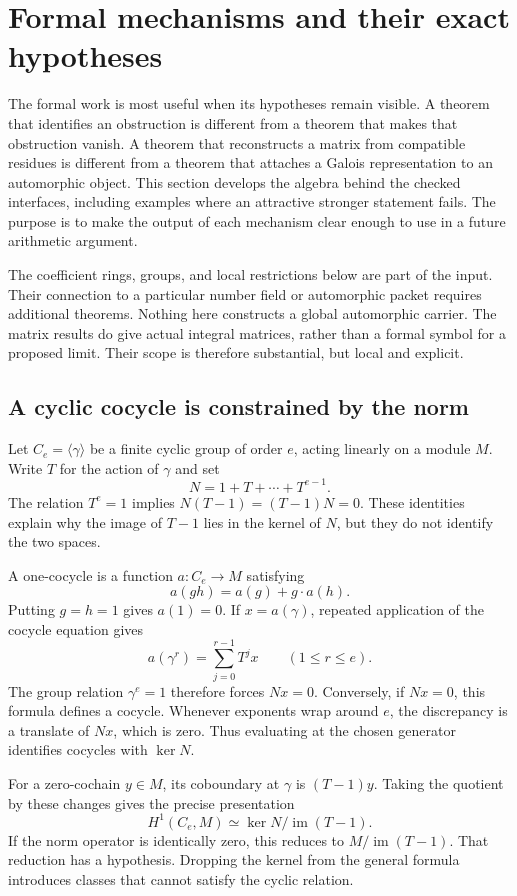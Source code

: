 \section{Formal mechanisms and their exact hypotheses}
\label{sec:formal-mechanisms}

The formal work is most useful when its hypotheses remain visible. A theorem
that identifies an obstruction is different from a theorem that makes that
obstruction vanish. A theorem that reconstructs a matrix from compatible
residues is different from a theorem that attaches a Galois representation to
an automorphic object. This section develops the algebra behind the checked
interfaces, including examples where an attractive stronger statement fails.
The purpose is to make the output of each mechanism clear enough to use in a
future arithmetic argument.

The coefficient rings, groups, and local restrictions below are part of the
input. Their connection to a particular number field or automorphic packet
requires additional theorems. Nothing here constructs a global automorphic
carrier. The matrix results do give actual integral matrices, rather than a
formal symbol for a proposed limit. Their scope is therefore substantial, but
local and explicit.

\subsection{A cyclic cocycle is constrained by the norm}

Let $C_e=\langle\gamma\rangle$ be a finite cyclic group of order $e$, acting
linearly on a module $M$. Write $T$ for the action of $\gamma$ and set
\[
 N=1+T+\cdots+T^{e-1}.
\]
The relation $T^e=1$ implies $N(T-1)=(T-1)N=0$. These identities explain why
the image of $T-1$ lies in the kernel of $N$, but they do not identify the two
spaces.

A one-cocycle is a function $a:C_e\to M$ satisfying
\[
 a(gh)=a(g)+g\cdot a(h).
\]
Putting $g=h=1$ gives $a(1)=0$. If $x=a(\gamma)$, repeated application of the
cocycle equation gives
\[
 a(\gamma^r)=\sum_{j=0}^{r-1}T^j x\qquad(1\le r\le e).
\]
The group relation $\gamma^e=1$ therefore forces $Nx=0$. Conversely, if
$Nx=0$, this formula defines a cocycle. Whenever exponents wrap around $e$,
the discrepancy is a translate of $Nx$, which is zero. Thus evaluating at
the chosen generator identifies cocycles with $\ker N$.

For a zero-cochain $y\in M$, its coboundary at $\gamma$ is $(T-1)y$. Taking
the quotient by these changes gives the precise presentation
\begin{equation}
 H^1(C_e,M)\simeq \ker N/\operatorname{im}(T-1).
 \label{eq:appendix-cyclic-H1}
\end{equation}
If the norm operator is identically zero, this reduces to
$M/\operatorname{im}(T-1)$. That reduction has a hypothesis. Dropping the
kernel from the general formula introduces classes that cannot satisfy the
cyclic relation.

